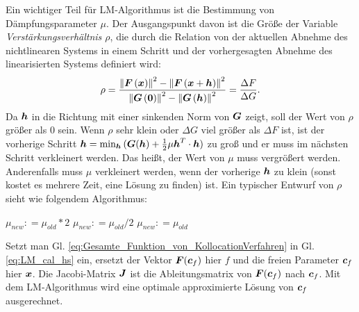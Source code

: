 Ein wichtiger Teil für LM-Algorithmus ist die Bestimmung von Dämpfungsparameter $\mu$. Der Ausgangspunkt davon ist die Größe der Variable \emph{Verstärkungsverhältnis $\rho$}, die durch die Relation von der aktuellen Abnehme des nichtlinearen Systems in einem Schritt und der vorhergesagten Abnehme des linearisierten Systems definiert wird:  
\begin{eqnarray}
	\rho  = \frac{\left \|\boldsymbol F\left ( \boldsymbol x \right )\right \|^{2}-\left \| \boldsymbol F\left ( \boldsymbol x+\boldsymbol h \right )\right \|^{2}}{\left \| \boldsymbol G\left ( \boldsymbol 0 \right )\right \|^{2}-\left \| \boldsymbol G\left ( \boldsymbol h \right )\right \|^{2}} = \frac{\Delta F}{\Delta G}.
\label{eq:LM-Methode-rho}
\end{eqnarray}
Da $\boldsymbol h$ in die Richtung mit einer sinkenden Norm von $\boldsymbol G$ zeigt, soll der Wert von $\rho$ größer als $0$ sein. Wenn $\rho$ sehr klein oder $\Delta G$ viel größer als $\Delta F$ ist, ist der vorherige Schritt $\boldsymbol h = \min_{\boldsymbol h}{(\boldsymbol G(\boldsymbol h) + \frac{1}{2}\mu \boldsymbol h^{T}\cdot \boldsymbol h)} $ zu groß und er muss im nächsten Schritt verkleinert werden. Das heißt, der Wert von $\mu$ muss vergrößert werden. Anderenfalls muss $\mu$ verkleinert werden, wenn der vorherige $\boldsymbol h$ zu klein (sonst kostet es mehrere Zeit, eine Lösung zu finden) ist. Ein typischer Entwurf von $\rho$ sieht wie folgendem Algorithmus:
\begin{algorithmic}
	\State $\mu_{new}: = \mu_{old} *2 $
	\State $\mu_{new}: = \mu_{old} / 2$
	\Else
	\State $\mu_{new} : = \mu_{old} $
	\EndIf
\label{Ag:dampfung_parameter}
\end{algorithmic}
                              
Setzt man Gl. \eqref{eq:Gesamte_Funktion_von_KollocationVerfahren} in Gl. \eqref{eq:LM_cal_hs} ein, ersetzt der Vektor $\boldsymbol F(\boldsymbol c_{f})$ hier $f$ und die freien Parameter $\boldsymbol c_{f}$ hier $\boldsymbol x$. Die Jacobi-Matrix $\boldsymbol J$ ist die Ableitungsmatrix von $\boldsymbol F(\boldsymbol c_{f})$ nach $\boldsymbol c_{f}$. Mit dem LM-Algorithmus wird eine optimale approximierte Lösung von $\boldsymbol c_{f}$ ausgerechnet. 

